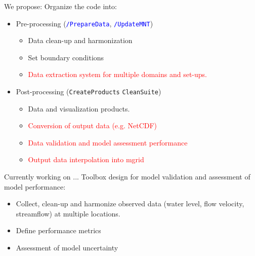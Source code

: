 \documentclass{beamer}
\begin{document}
\begin{frame}[allowframebreaks]{We propose:}
Organize the code into:
\begin{itemize}
\item Pre-processing (\texttt{\textcolor{blue}{/PrepareData}}, \texttt{\textcolor{blue}{/UpdateMNT}})
\begin{itemize}
\item Data clean-up and harmonization
\item Set boundary conditions
\item \textcolor{red}{Data extraction system for multiple domains and set-ups.}
\end{itemize}

\framebreak

\item Post-processing (\texttt{CreateProducts} \texttt{CleanSuite})
\begin{itemize}
\item Data and visualization products.
\item \textcolor{red}{Conversion of output data (e.g. NetCDF)}
\item \textcolor{red}{Data validation and model assessment performance}
\item \textcolor{red}{Output data interpolation into mgrid}
\end{itemize}
\end{itemize}

\end{frame}


\begin{frame}{Currently working on ...}
Toolbox design for model validation and assessment of model performance:
\begin{itemize}
\item Collect, clean-up and harmonize observed data (water level, flow velocity, streamflow) at multiple locations.
\item Define performance metrics
\item Assessment of model uncertainty
\end{itemize}

\end{frame}
\end{document}
